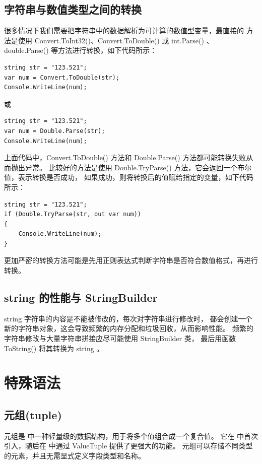 \subsection{字符串与数值类型之间的转换}
很多情况下我们需要把字符串中的数据解析为可计算的数值型变量，最直接的
方法是使用 Convert.ToInt32()、Convert.ToDouble() 或 int.Parse() 、double.Parse() 等方法进行转换，如下代码所示：

\begin{lstlisting}
string str = "123.521";
var num = Convert.ToDouble(str);
Console.WriteLine(num);
\end{lstlisting}

或

\begin{lstlisting}
string str = "123.521";
var num = Double.Parse(str);
Console.WriteLine(num);
\end{lstlisting}

上面代码中，Convert.ToDouble() 方法和 Double.Parse() 方法都可能转换失败从而抛出异常。
比较好的方法是使用 Double.TryParse() 方法，它会返回一个布尔值，表示转换是否成功，
如果成功，则将转换后的值赋给指定的变量，如下代码所示：

\begin{lstlisting}
string str = "123.521";
if (Double.TryParse(str, out var num))
{
    Console.WriteLine(num);
}
\end{lstlisting}

更加严密的转换方法可能是先用正则表达式判断字符串是否符合数值格式，再进行转换。

\subsection{ string 的性能与 StringBuilder}

string 字符串的内容是不能被修改的，每次对字符串进行修改时，
都会创建一个新的字符串对象，这会导致频繁的内存分配和垃圾回收，从而影响性能。
频繁的字符串修改与大量字符串拼接应尽可能使用
StringBuilder 类， 最后用函数 ToString() 将其转换为 string 。

\section{ \cs 特殊语法}

\subsection{元组(tuple)}

元组是 \cs 中一种轻量级的数据结构，用于将多个值组合成一个复合值。
它在  中首次引入，随后在  中通过 ValueTuple 提供了更强大的功能。
元组可以存储不同类型的元素，并且无需显式定义字段类型和名称。

